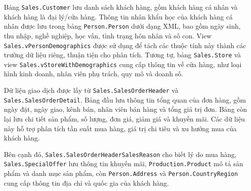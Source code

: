 \documentclass[a4paper,12pt]{article}
\numberwithin{figure}{section}
\numberwithin{table}{section}
\begin{document}
Bảng \texttt{Sales.Customer} lưu danh sách khách hàng, gồm khách hàng cá nhân và khách hàng là đại lý/cửa hàng. Thông tin nhân khẩu học của khách hàng cá nhân được lưu trong bảng \texttt{Person.Person} dưới dạng XML, bao gồm ngày sinh, thu nhập, nghề nghiệp, học vấn, tình trạng hôn nhân và số con. View \texttt{Sales.vPersonDemographics} được sử dụng để tách các thuộc tính này thành các trường dữ liệu riêng, thuận tiện cho phân tích. Tương tự, bảng \texttt{Sales.Store} và view \texttt{Sales.vStoreWithDemographics} cung cấp thông tin về cửa hàng, như loại hình kinh doanh, nhân viên phụ trách, quy mô và doanh số.

Dữ liệu giao dịch được lấy từ \texttt{Sales.SalesOrderHeader} và \texttt{Sales.SalesOrderDetail}. Bảng đầu lưu thông tin tổng quan của đơn hàng, gồm ngày đặt, ngày giao, kênh bán, nhân viên bán hàng và tổng giá trị đơn. Bảng còn lại lưu chi tiết sản phẩm, số lượng, đơn giá, giảm giá và khuyến mãi. Các dữ liệu này hỗ trợ phân tích tần suất mua hàng, giá trị chi tiêu và xu hướng mua của khách hàng.

Bên cạnh đó, \texttt{Sales.\allowbreak SalesOrderHeader\-SalesReason} cho biết lý do mua hàng, \texttt{Sales.\allowbreak SpecialOffer} lưu thông tin khuyến mãi, \texttt{Production.\allowbreak Product} mô tả sản phẩm và danh mục sản phẩm, còn \texttt{Person.\allowbreak Address} và \texttt{Person.\allowbreak CountryRegion} cung cấp thông tin địa chỉ và quốc gia của khách hàng.
\end{document}
